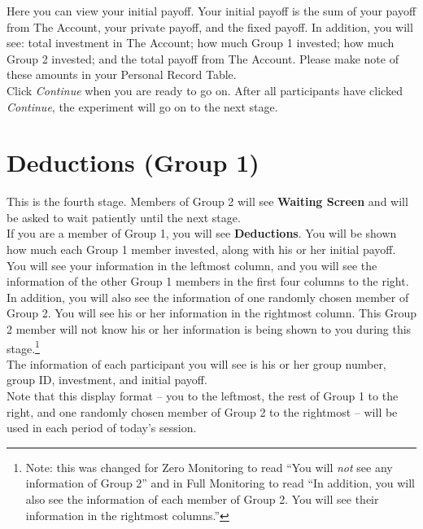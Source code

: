 \documentclass[12pt]{article}
\begin{document}
Here you can view your initial payoff.  Your initial payoff is the sum of your payoff from The Account, your private payoff, and the fixed payoff. In addition, you will see: total investment in The Account; how much Group 1 invested; how much Group 2 invested; and the total payoff from The Account. Please make note of these amounts in your Personal Record Table.\\

Click {\em Continue} when you are ready to go on.  After all participants have clicked {\em Continue}, the experiment will go on to the next stage.\\  



\section{Deductions (Group 1)}

This is the fourth stage. Members of Group 2 will see {\bf Waiting Screen} and will be asked to wait patiently until the next stage.\\   

If you are a member of Group 1, you will see {\bf Deductions}. You will be shown how much each Group 1 member invested, along with his or her initial payoff. You will see your information in the leftmost column, and you will see the information of the other Group 1 members in the first four columns to the right.\\

In addition, you will also see the information of one randomly chosen member of Group 2. You will see his or her information in the rightmost column. This Group 2 member will not know his or her information is being shown to you during this stage.\footnote{Note: this was changed for Zero Monitoring to read ``You will {\em not} see any information of Group 2'' and in Full Monitoring to read ``In addition, you will also see the information of each member of Group 2. You will see their information in the rightmost columns.''}\\

The information of each participant you will see is his or her group number, group ID, investment, and initial payoff.\\ 

Note that this display format -- you to the leftmost, the rest of Group 1 to the right, and one randomly chosen member of Group 2 to the rightmost -- will be used in each period of today's session.\\
\end{document}
